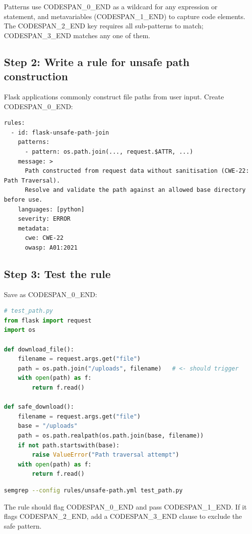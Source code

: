 \documentclass[11pt,a4paper]{book}
\begin{document}
Patterns use CODESPAN\_0\_END as a wildcard for any expression or statement, and metavariables (CODESPAN\_1\_END) to capture code elements. The CODESPAN\_2\_END key requires all sub-patterns to match; CODESPAN\_3\_END matches any one of them.

\subsection{Step 2: Write a rule for unsafe path construction}

Flask applications commonly construct file paths from user input. Create CODESPAN\_0\_END:

\begin{lstlisting}
rules:
  - id: flask-unsafe-path-join
    patterns:
      - pattern: os.path.join(..., request.$ATTR, ...)
    message: >
      Path constructed from request data without sanitisation (CWE-22: Path Traversal).
      Resolve and validate the path against an allowed base directory before use.
    languages: [python]
    severity: ERROR
    metadata:
      cwe: CWE-22
      owasp: A01:2021
\end{lstlisting}

\subsection{Step 3: Test the rule}

Save as CODESPAN\_0\_END:

\begin{lstlisting}[language=Python]
# test_path.py
from flask import request
import os

def download_file():
    filename = request.args.get("file")
    path = os.path.join("/uploads", filename)   # <- should trigger
    with open(path) as f:
        return f.read()

def safe_download():
    filename = request.args.get("file")
    base = "/uploads"
    path = os.path.realpath(os.path.join(base, filename))
    if not path.startswith(base):
        raise ValueError("Path traversal attempt")
    with open(path) as f:
        return f.read()
\end{lstlisting}

\begin{lstlisting}[language=Bash]
semgrep --config rules/unsafe-path.yml test_path.py
\end{lstlisting}

The rule should flag CODESPAN\_0\_END and pass CODESPAN\_1\_END. If it flags CODESPAN\_2\_END, add a CODESPAN\_3\_END clause to exclude the safe pattern.
\end{document}
